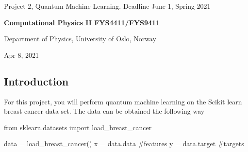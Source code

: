 \documentclass[%
oneside,                 %
final,                   %
10pt]{article}
\begin{document}

\newcommand{\exercisesection}[1]{\subsection*{#1}}






\thispagestyle{empty}

\begin{center}
{\LARGE\bf
\begin{spacing}{1.25}
Project 2, Quantum Machine Learning. Deadline June 1, Spring 2021
\end{spacing}
}
\end{center}


\begin{center}
{\bf \href{{http://www.uio.no/studier/emner/matnat/fys/FYS4411/index-eng.html}}{Computational Physics II FYS4411/FYS9411}}
\end{center}

    \begin{center}
\centerline{{\small Department of Physics, University of Oslo, Norway}}
\end{center}
    

\begin{center}
Apr 8, 2021
\end{center}

\vspace{1cm}


\subsection{Introduction}

For this project, you will perform quantum machine learning on the Scikit learn breast cancer data set. The data can be obtained the following way

\bpycod
from sklearn.datasets import load_breast_cancer

data = load_breast_cancer()
x = data.data #features
y = data.target #targets
\end{document}
